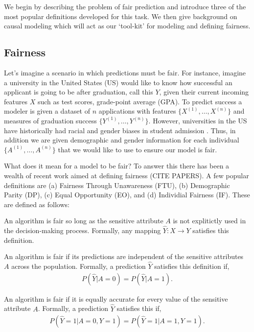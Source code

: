 We begin by describing the problem of fair prediction and introduce three of the most popular definitions developed for this task.  We then give background on causal modeling which will act as our `tool-kit' for modeling and defining fairness.

\subsection{Fairness}
Let's imagine a scenario in which predictions must be fair. For instance, imagine a university in the United States (US) would like to know how successful an applicant is going to be after graduation, call this $Y$, given their current incoming features $X$ such as test scores, grade-point average (GPA). To predict success a modeler is given a dataset of $n$ applications with features $\{X^{(1)}, \ldots, X^{(n)} \}$ and measures of graduation success $\{Y^{(1)}, \ldots, Y^{(n)}\}$. However, universities in the US have historically had racial and gender biases in student admission \cite{kane1998racial,kidder2000portia}. Thus, in addition we are given demographic and gender information for each individual $\{A^{(1)}, \ldots, A^{(n)}\}$ that we would like to use to ensure our model is fair.

What does it mean for a model to be fair? To answer this there has been a wealth of recent work aimed at defining fairness (CITE PAPERS). A few popular definitions are (a) Fairness Through Unawareness (FTU), (b) Demographic Parity (DP), (c) Equal Opportunity (EO), and (d) Individial Fairness (IF). These are defined as follows:

\begin{define}
An algorithm is fair so long as the sensitive attribute $A$ is not explitictly used in the decision-making process. Formally, any mapping $\hat{Y}: X \rightarrow Y$ satisfies this definition.
\end{define}

\begin{define}
An algorithm is fair if its predictions are independent of the sensitive attributes $A$ across the population. Formally, a prediction $\hat{Y}$ satisfies this definition if, 
\begin{align}
P(\hat{Y} | A = 0) = P(\hat{Y} | A = 1). \nonumber
\end{align}
\end{define}

\begin{define}
An algorithm is fair if it is equally accurate for every value of the sensitive attribute $A$. Formally, a prediction $\hat{Y}$ satisfies this if,
\begin{align}
P(\hat{Y}=1 | A=0,Y=1) = P(\hat{Y}=1 | A=1,Y=1). \nonumber
\end{align}
\end{define}

